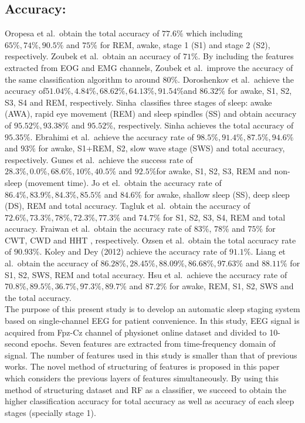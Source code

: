 \documentclass[12pt,letterpaper]{article}
\begin{document}
\subsection*{ Accuracy:}

Oropesa et al.\ obtain the total accuracy of $77.6\%$ which including $65\%, 74\%, 90.5\%$ and $75\%$ for REM, awake, stage 1 (S1) and stage 2 (S2), respectively. Zoubek et al.\ obtain an accuracy of $71\%$. By including the features extracted from EOG and EMG channels, Zoubek et al.\ improve the accuracy of the same classification algorithm to around $80\%$. Doroshenkov et al.\ achieve the accuracy of$ 51.04\%, 4.84\%, 68.62\%, 64.13\%, 91.54\% $and $86.32\%$ for awake, S1, S2, S3, S4 and REM, respectively. Sinha\ classifies three stages of sleep: awake (AWA), rapid eye movement (REM) and sleep spindles (SS) and obtain accuracy of $95.52\%, 93.38\%$ and $95.52\% $, respectively. Sinha achieves the total accuracy of $95.35\%$.  Ebrahimi et al.\ achieve the accuracy rate of $98.5\%, 91.4\%, 87.5\%, 94.6\%$ and $93\%$ for awake, S1+REM, S2, slow wave stage (SWS) and total accuracy, respectively. Gunes et al.\ achieve the success rate of $28.3\%, 0.0\%, 68.6\%, 10\%, 40.5\%$ and $92.5\% $for awake, S1, S2, S3, REM and non-sleep (movement time). Jo et el.\ obtain the accuracy rate of $86.4\%, 83.9\%, 84.3\%, 85.5\%$ and $84.6\%$ for awake, shallow sleep (SS), deep sleep (DS), REM and total accuracy. Tagluk et al.\ obtain the accuracy of $72.6\%, 73.3\%, 78\%, 72.3\%, 77.3\%$ and $74.7\%$ for S1, S2, S3, S4, REM and total accuracy. Fraiwan et al.\ obtain the accuracy rate of $83\%$, $78\%$ and $75\%$ for CWT, CWD and HHT , respectively. Ozsen et al.\ obtain the total accuracy rate of $90.93\%$. Koley and Dey (2012) achieve the accuracy rate of $91.1\%$. Liang et al.\ obtain the accuracy of $86.28\%, 28.45\%, 88.09\%, 86.68\%, 97.63\%$ and $88.11\%$ for S1, S2, SWS, REM and total accuracy. Hsu et al.\ achieve the accuracy rate of $70.8\%, 89.5\%, 36.7\%, 97.3\%, 89.7\%$ and $87.2\%$ for awake, REM, S1, S2, SWS and the total accuracy.\\

 
The purpose of this present study is to develop an automatic sleep staging system based on single-channel EEG for patient convenience. In this study, EEG signal is acquired from Fpz-Cz channel of physionet online dataset and divided to 10-second epochs. Seven features are extracted from time-frequency domain of signal. The number of features used in this study is smaller than that of previous works. The novel method of structuring of features is proposed in this paper which considers the previous layers of features simultaneously. By using this method of structuring dataset and RF as a classifier, we succeed to obtain the higher classification accuracy for total accuracy as well as accuracy of each sleep stages (specially stage 1). 
\end{document}
